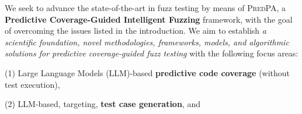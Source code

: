 \documentclass[11pt]{article}
\newcommand{\tool}{\textsc{PredPA}\xspace}
\begin{document}

We seek to advance the state-of-the-art in fuzz testing by means of
{\tool}, a {\bf Predictive Coverage-Guided Intelligent Fuzzing}
framework, with the goal of overcoming the issues listed in the
introduction. We aim to establish {\em a scientific foundation, novel
  methodologies, frameworks, models, and algorithmic solutions for
  predictive coverage-guided fuzz testing} with the following focus
areas:

(1) Large Language Models (LLM)-based {\bf predictive code coverage} (without test execution),

(2) LLM-based, targeting, {\bf test case generation}, and
\end{document}
